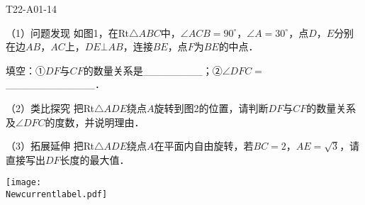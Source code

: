 \begin{defproblem}{T22-A01-14}%
\begin{onlyproblem}%
（1）问题发现 如图1，在Rt$\triangle ABC$中，$\angle ACB=90^{\circ}$，$\angle A=30^{\circ}$，点$D$，$E$分别在边$AB$，$AC$上，$DE\bot AB$，连接$BE$，点$F$为$BE$的中点．

填空：①$DF$与$CF$的数量关系是{\_}{\_}{\_}{\_}{\_}{\_}{\_}{\_}；②$\angle DFC=${\_}{\_}{\_}{\_}{\_}{\_}{\_}{\_}{\_}{\_}{\_}{\_}．

（2）类比探究 把Rt$\triangle ADE$绕点$A$旋转到图2的位置，请判断$DF$与$CF$的数量关系及$\angle DFC$的度数，并说明理由．

（3）拓展延伸 把Rt$\triangle ADE$绕点$A$在平面内自由旋转，若$BC=2$，$AE=\sqrt 3 $，请直接写出$DF$长度的最大值．

\vspace*{5\baselineskip}
\texttt{[image: \\Newcurrentlabel.pdf]}
\end{onlyproblem}%
\begin{onlysolution}%

\end{onlysolution}%
\end{defproblem}





